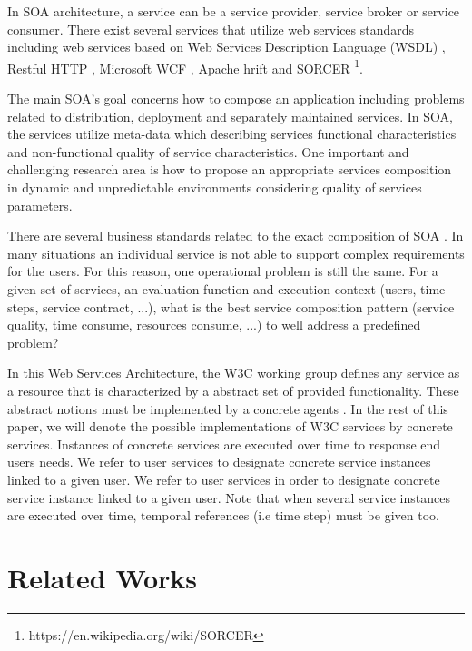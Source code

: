 \documentclass[10pt,journal,compsoc]{IEEEtran}
\begin{document}
In SOA architecture, a service can be a service provider, service broker or service consumer. There exist several services that utilize web services standards including web services based on Web Services Description Language (WSDL) \cite{christensen2001}, Restful HTTP \cite{Pautasso2014}, Microsoft WCF \cite{Cibraro2010}, Apache hrift \cite{Apachetrift2007} and SORCER \cite{Papazoglou2007b}\footnote{https://en.wikipedia.org/wiki/SORCER}.

The main SOA's goal concerns how to compose an application including problems related to distribution, deployment and separately maintained services. In SOA, the services utilize meta-data which describing services functional characteristics and non-functional quality of service characteristics. One important and challenging research area is how to propose an appropriate services composition in dynamic and unpredictable environments\cite{Mostafa2015,BenMabrouk2009,SONG2013} considering quality of services parameters. 


There are several business standards related to the exact composition of SOA \cite{Balzer2004,Valipour2009}. In many situations an individual service is not able to support complex requirements for the users. For this reason, one operational problem is still the same. For a given set of services, an evaluation function and execution context (users, time steps, service contract, ...), what is the best service composition pattern (service quality, time consume, resources consume, ...) to well address a predefined problem?

In this Web Services Architecture, the W3C working group defines any service as a resource that is characterized by a abstract set of provided functionality. These abstract notions must be implemented by a concrete agents \cite{W3C2004}. In the rest of this paper, we will denote the possible implementations of W3C services by concrete services. Instances of concrete services are executed over time to response end users needs. We refer to user services to designate concrete service instances linked to a given user. We refer to user services in order to designate concrete service instance linked to a given user. Note that when several service instances are executed over time, temporal references (i.e time step) must be given too.

\section{Related Works}\label{sec:related-work}
\end{document}
